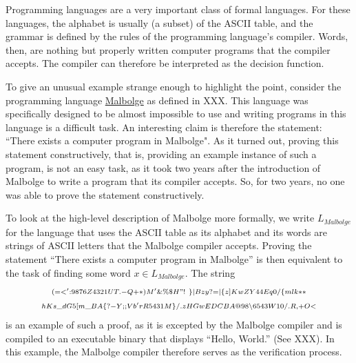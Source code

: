 \begin{example}Programming languages are a very important class of formal languages. For these languages, the alphabet is usually (a subset) of the ASCII table, and the grammar is defined by the rules of the programming language's compiler. Words, then, are nothing but properly written computer programs that the compiler accepts. The compiler can therefore be interpreted as the decision function.

To give an unusual example strange enough to highlight the point, consider the programming language \href{https://en.wikipedia.org/wiki/Malbolge}{Malbolge} as defined in XXX. This language was specifically designed to be almost impossible to use and writing programs in this language is a difficult task. An interesting claim is therefore the statement: ``There exists a computer program in Malbolge". As it turned out, proving this statement constructively, that is, providing an example instance of such a program, is not an easy task, as it took two years after the introduction of Malbolge to write a program that its compiler accepts. So, for two years, no one was able to prove the statement constructively.

To look at the high-level description of Malbolge more formally, we write $L_{Malbolge}$ for the language that uses the ASCII table as its alphabet and its words are strings of ASCII letters that the Malbolge compiler accepts. Proving the statement ``There exists a computer program in Malbolge'' is then equivalent to the task of finding some word $x\in L_{Malbolge}$. The string
\begin{multline*}
\scriptstyle (=<':9876Z4321UT.-Q+*)M'\&\%\$H"!~\}|Bzy?=|\{z]KwZY44Eq0/
\{mlk** \\ 
\scriptstyle hKs\_dG5[m\_BA\{?-Y;;Vb'rR5431M\}/.zHGwEDCBA@98\backslash 6543W10/.R,+O<
\end{multline*}
is an example of such a proof, as it is excepted by the Malbolge compiler and is compiled to an executable binary that displays ``Hello, World.'' (See XXX). In this example, the Malbolge compiler therefore serves as the verification process.
\end{example}
